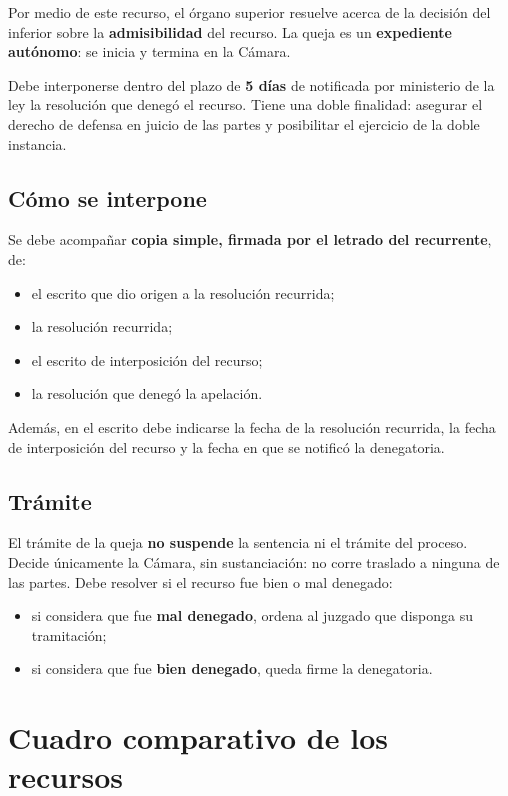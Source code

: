 \documentclass[12pt,oneside]{book}
\begin{document}
Por medio de este recurso, el \'organo superior resuelve acerca de la decisi\'on del inferior sobre la \textbf{admisibilidad} del recurso. La queja es un \textbf{expediente aut\'onomo}: se inicia y termina en la C\'amara.

Debe interponerse dentro del plazo de \textbf{5 d\'ias} de notificada por ministerio de la ley la resoluci\'on que deneg\'o el recurso. Tiene una doble finalidad: asegurar el derecho de defensa en juicio de las partes y posibilitar el ejercicio de la doble instancia.

\subsection{C\'omo se interpone}

Se debe acompa\~nar \textbf{copia simple, firmada por el letrado del recurrente}, de:
\begin{itemize}
    \item el escrito que dio origen a la resoluci\'on recurrida;
    \item la resoluci\'on recurrida;
    \item el escrito de interposici\'on del recurso;
    \item la resoluci\'on que deneg\'o la apelaci\'on.
\end{itemize}

Adem\'as, en el escrito debe indicarse la fecha de la resoluci\'on recurrida, la fecha de interposici\'on del recurso y la fecha en que se notific\'o la denegatoria.

\subsection{Tr\'amite}

El tr\'amite de la queja \textbf{no suspende} la sentencia ni el tr\'amite del proceso. Decide \'unicamente la C\'amara, sin sustanciaci\'on: no corre traslado a ninguna de las partes. Debe resolver si el recurso fue bien o mal denegado:

\begin{itemize}
    \item si considera que fue \textbf{mal denegado}, ordena al juzgado que disponga su tramitaci\'on;
    \item si considera que fue \textbf{bien denegado}, queda firme la denegatoria.
\end{itemize}

\section{Cuadro comparativo de los recursos}
\end{document}
